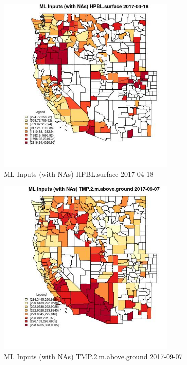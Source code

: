 \begin{figure} 
\centering  
\includegraphics[width=0.77\textwidth]{Code_Outputs/Report_ML_input_PM25_Step4_part_e_de_duplicated_aves_compiled_2019-05-20wNAs_CountyHPBLsurfaceMean2017-04-18.jpg} 
\caption{\label{fig:Report_ML_input_PM25_Step4_part_e_de_duplicated_aves_compiled_2019-05-20wNAsCountyHPBLsurfaceMean2017-04-18}ML Inputs (with NAs) HPBL.surface 2017-04-18} 
\end{figure} 
 

\begin{figure} 
\centering  
\includegraphics[width=0.77\textwidth]{Code_Outputs/Report_ML_input_PM25_Step4_part_e_de_duplicated_aves_compiled_2019-05-20wNAs_CountyTMP2mabovegroundMean2017-09-07.jpg} 
\caption{\label{fig:Report_ML_input_PM25_Step4_part_e_de_duplicated_aves_compiled_2019-05-20wNAsCountyTMP2mabovegroundMean2017-09-07}ML Inputs (with NAs) TMP.2.m.above.ground 2017-09-07} 
\end{figure} 
 

